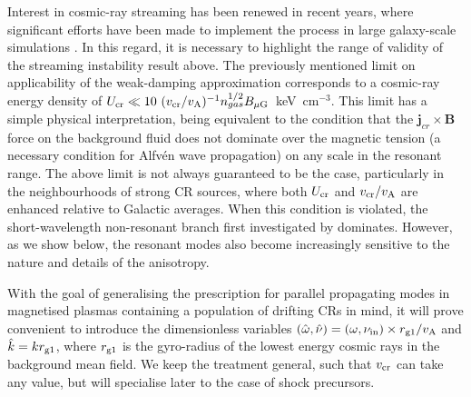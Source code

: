 \documentclass[a4paper,fleqn,usenatbib]{mnras}
\begin{document}
Interest in cosmic-ray streaming has been renewed in recent years, where 
{ significant efforts have been made to implement the process in large galaxy-scale 
simulations} \citep{JiangOh, ThomasPfrommer, Hopkins}. In this regard, it is necessary to highlight the range of validity of the streaming instability result above. The previously mentioned limit on applicability  of the weak-damping approximation corresponds to a cosmic-ray energy density of $U_{\rm cr} \ll 10 ~  (v_{\rm cr}/v_{\rm A})^{-1} n_{gas}^{1/2} B_{\rm \mu G}$~keV~cm$^{-3}$. This limit has a simple physical interpretation, being equivalent to the condition that the $\bm{j}_{cr} \times \bm{B}$ force on the background fluid does not dominate over the magnetic tension (a necessary condition for Alfv\'en wave propagation) on any scale in the resonant range. The above limit is not always guaranteed to be the case, particularly in the neighbourhoods of strong CR sources, where both $U_{\rm cr}$ and $v_{\rm cr}/v_{\rm A}$ are enhanced relative to Galactic averages.
When this condition is violated, the short-wavelength non-resonant branch first investigated by \cite{Bell04} dominates. However, as we show below, the resonant modes also become increasingly sensitive to the nature and details of the anisotropy. 


With the goal of generalising the prescription for parallel propagating modes in magnetised plasmas containing a population of drifting CRs in mind, it will prove convenient to introduce the dimensionless variables $(\hat{\omega}, \hat{\nu}) = (\omega, \nu_{\rm in}) \times  r_{\rm g1}/v_{\rm A}$ and $\hat{k} = k r_{\rm g1}$, where $r_{\rm g1}$ is the gyro-radius of the lowest energy cosmic rays in the background mean field. We 
keep the treatment general, such that $v_{\rm cr}$ can take any value, but will specialise later to the case of shock precursors.
\end{document}
